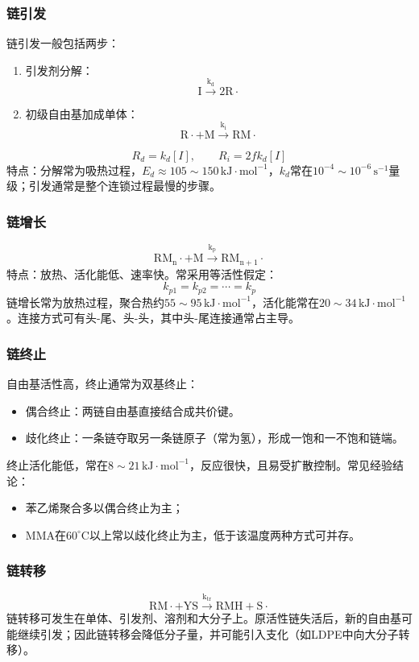 ﻿\documentclass[12pt,a4paper]{article}
\begin{document}
\subsubsection{链引发}
链引发一般包括两步：
\begin{enumerate}[1)]
  \item 引发剂分解：
  \[
  \mathrm{I \xrightarrow{k_d} 2R\cdot}
  \]
  \item 初级自由基加成单体：
  \[
  \mathrm{R\cdot + M \xrightarrow{k_i} RM\cdot}
  \]
\end{enumerate}
\[
R_d=k_d[I],\qquad R_i=2fk_d[I]
\]
特点：分解常为吸热过程，$E_d\approx105\sim150\,\mathrm{kJ\cdot mol^{-1}}$，$k_d$常在$10^{-4}\sim10^{-6}\,\mathrm{s^{-1}}$量级；引发通常是整个连锁过程最慢的步骤。

\subsubsection{链增长}
\[
\mathrm{RM_n\cdot + M \xrightarrow{k_p} RM_{n+1}\cdot}
\]
特点：放热、活化能低、速率快。常采用等活性假定：
\[
k_{p1}=k_{p2}=\cdots=k_p
\]
链增长常为放热过程，聚合热约$55\sim95\,\mathrm{kJ\cdot mol^{-1}}$，活化能常在$20\sim34\,\mathrm{kJ\cdot mol^{-1}}$。连接方式可有头-尾、头-头，其中头-尾连接通常占主导。

\subsubsection{链终止}
自由基活性高，终止通常为双基终止：
\begin{itemize}
  \item 偶合终止：两链自由基直接结合成共价键。
  \item 歧化终止：一条链夺取另一条链原子（常为氢），形成一饱和一不饱和链端。
\end{itemize}
终止活化能低，常在$8\sim21\,\mathrm{kJ\cdot mol^{-1}}$，反应很快，且易受扩散控制。常见经验结论：
\begin{itemize}
  \item 苯乙烯聚合多以偶合终止为主；
  \item MMA在$60^\circ\mathrm{C}$以上常以歧化终止为主，低于该温度两种方式可并存。
\end{itemize}

\subsubsection{链转移}
\[
\mathrm{RM\cdot + YS \xrightarrow{k_{tr}} RMH + S\cdot}
\]
链转移可发生在单体、引发剂、溶剂和大分子上。原活性链失活后，新的自由基可能继续引发；因此链转移会降低分子量，并可能引入支化（如LDPE中向大分子转移）。
\end{document}
